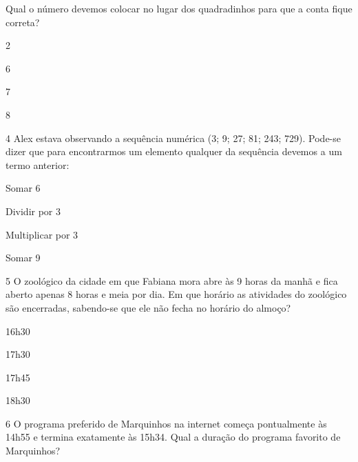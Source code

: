 Qual o número devemos colocar no lugar dos quadradinhos para que a conta
fique correta?

\begin{minipage}{.5\textwidth}
\begin{escolha}
\item
  2
\item
  6
\item
  7
\item
  8
\end{escolha}
\end{minipage}

\num{4} Alex estava observando a sequência numérica (3; 9; 27; 81; 243;
729). Pode-se dizer que para encontrarmos um elemento qualquer da
sequência devemos a um termo anterior:

\begin{minipage}{.5\textwidth}
\begin{escolha}
\item
  Somar 6
\item
  Dividir por 3
\item
  Multiplicar por 3
\item
  Somar 9
\end{escolha}
\end{minipage}

\num{5} O zoológico da cidade em que Fabiana mora abre às 9 horas da manhã
e fica aberto apenas 8 horas e meia por dia. Em que horário as atividades 
do zoológico são encerradas, sabendo-se que ele não fecha no horário do
almoço?

\begin{minipage}{.5\textwidth}
\begin{escolha}
\item
  16h30
\item
  17h30
\item
  17h45
\item
  18h30
\end{escolha}
\end{minipage}

\pagebreak
\num{6} O programa preferido de Marquinhos na internet começa pontualmente
às 14h55 e termina exatamente às 15h34.
Qual a duração do programa favorito de Marquinhos?

